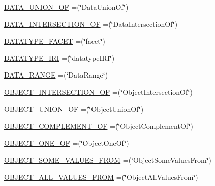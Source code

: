 \begin{DoxyCompactItemize}
\hyperlink{enumorg_1_1semanticweb_1_1owlapi_1_1vocab_1_1_o_w_l_x_m_l_vocabulary_afb38c088b21f74ed6687372927b54e41}{D\-A\-T\-A\-\_\-\-U\-N\-I\-O\-N\-\_\-\-O\-F} =(\char`\"{}Data\-Union\-Of\char`\"{})
\item 
\hyperlink{enumorg_1_1semanticweb_1_1owlapi_1_1vocab_1_1_o_w_l_x_m_l_vocabulary_a5629bf16ea956ed415efe5fc020ca088}{D\-A\-T\-A\-\_\-\-I\-N\-T\-E\-R\-S\-E\-C\-T\-I\-O\-N\-\_\-\-O\-F} =(\char`\"{}Data\-Intersection\-Of\char`\"{})
\item 
\hyperlink{enumorg_1_1semanticweb_1_1owlapi_1_1vocab_1_1_o_w_l_x_m_l_vocabulary_a540d534b1ce3b9d3054f5f0bec646e26}{D\-A\-T\-A\-T\-Y\-P\-E\-\_\-\-F\-A\-C\-E\-T} =(\char`\"{}facet\char`\"{})
\item 
\hyperlink{enumorg_1_1semanticweb_1_1owlapi_1_1vocab_1_1_o_w_l_x_m_l_vocabulary_a2b4aa96209e7c6902fc017d0b85249de}{D\-A\-T\-A\-T\-Y\-P\-E\-\_\-\-I\-R\-I} =(\char`\"{}datatype\-I\-R\-I\char`\"{})
\item 
\hyperlink{enumorg_1_1semanticweb_1_1owlapi_1_1vocab_1_1_o_w_l_x_m_l_vocabulary_abe0b246ce8cd0e911ebd3362a31ecdec}{D\-A\-T\-A\-\_\-\-R\-A\-N\-G\-E} =(\char`\"{}Data\-Range\char`\"{})
\item 
\hyperlink{enumorg_1_1semanticweb_1_1owlapi_1_1vocab_1_1_o_w_l_x_m_l_vocabulary_a54638fb0e76a35149fe3396d6031797a}{O\-B\-J\-E\-C\-T\-\_\-\-I\-N\-T\-E\-R\-S\-E\-C\-T\-I\-O\-N\-\_\-\-O\-F} =(\char`\"{}Object\-Intersection\-Of\char`\"{})
\item 
\hyperlink{enumorg_1_1semanticweb_1_1owlapi_1_1vocab_1_1_o_w_l_x_m_l_vocabulary_a48aa5f738fe2cd26f70ab2d319e7e145}{O\-B\-J\-E\-C\-T\-\_\-\-U\-N\-I\-O\-N\-\_\-\-O\-F} =(\char`\"{}Object\-Union\-Of\char`\"{})
\item 
\hyperlink{enumorg_1_1semanticweb_1_1owlapi_1_1vocab_1_1_o_w_l_x_m_l_vocabulary_a1d2d495a5c33750eab9a2af6698775d8}{O\-B\-J\-E\-C\-T\-\_\-\-C\-O\-M\-P\-L\-E\-M\-E\-N\-T\-\_\-\-O\-F} =(\char`\"{}Object\-Complement\-Of\char`\"{})
\item 
\hyperlink{enumorg_1_1semanticweb_1_1owlapi_1_1vocab_1_1_o_w_l_x_m_l_vocabulary_a1551f3f161288107adf0b49e068f7a96}{O\-B\-J\-E\-C\-T\-\_\-\-O\-N\-E\-\_\-\-O\-F} =(\char`\"{}Object\-One\-Of\char`\"{})
\item 
\hyperlink{enumorg_1_1semanticweb_1_1owlapi_1_1vocab_1_1_o_w_l_x_m_l_vocabulary_ab2f651c62dac6190d9b12901b73e2a55}{O\-B\-J\-E\-C\-T\-\_\-\-S\-O\-M\-E\-\_\-\-V\-A\-L\-U\-E\-S\-\_\-\-F\-R\-O\-M} =(\char`\"{}Object\-Some\-Values\-From\char`\"{})
\item 
\hyperlink{enumorg_1_1semanticweb_1_1owlapi_1_1vocab_1_1_o_w_l_x_m_l_vocabulary_ab84b61b31d0745588e5945b538642796}{O\-B\-J\-E\-C\-T\-\_\-\-A\-L\-L\-\_\-\-V\-A\-L\-U\-E\-S\-\_\-\-F\-R\-O\-M} =(\char`\"{}Object\-All\-Values\-From\char`\"{})

\end{DoxyCompactItemize}

